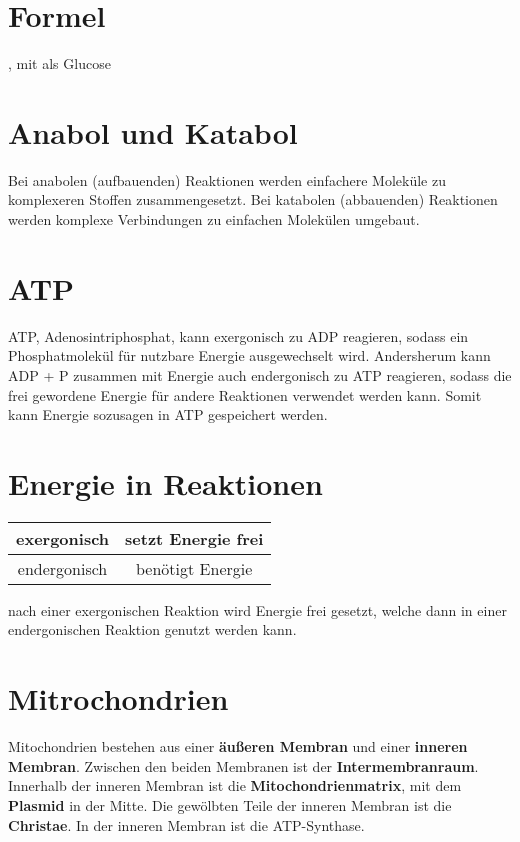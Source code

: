 \documentclass{article}
\begin{document}
 
\section{Formel} 
, mit  als Glucose
  
\section{Anabol und Katabol} 
Bei anabolen (aufbauenden) Reaktionen werden einfachere Moleküle zu komplexeren Stoffen zusammengesetzt. Bei katabolen (abbauenden) Reaktionen werden komplexe Verbindungen zu einfachen Molekülen umgebaut.
 
\section{ATP}
ATP, Adenosintriphosphat, kann exergonisch zu ADP reagieren, sodass ein Phosphatmolekül für nutzbare Energie ausgewechselt wird. Andersherum kann ADP + P zusammen mit Energie auch endergonisch zu ATP reagieren, sodass die frei gewordene Energie für andere Reaktionen verwendet werden kann. Somit kann Energie sozusagen in ATP gespeichert werden.
 
\section{Energie in Reaktionen}
 
\begin{center}
\begin{tabular}{ |c|c| }
\hline
 exergonisch & setzt Energie frei \\
\hline
 endergonisch & benötigt Energie \\
\hline
\end{tabular}
\end{center}
nach einer exergonischen Reaktion wird Energie frei gesetzt, welche dann in einer endergonischen Reaktion genutzt werden kann.
 
\section{Mitrochondrien} 
Mitochondrien bestehen aus einer \textbf{äußeren Membran} und einer \textbf{inneren Membran}. Zwischen den beiden Membranen ist der \textbf{Intermembranraum}. Innerhalb der inneren Membran ist die \textbf{Mitochondrienmatrix}, mit dem \textbf{Plasmid} in der Mitte. Die gewölbten Teile der inneren Membran ist die \textbf{Christae}.
In der inneren Membran ist die ATP-Synthase.
 
\end{document}
